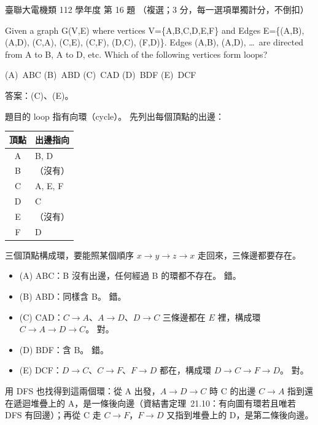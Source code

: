 \begin{pastexam}[label={px:ust-112-ee-ds-16}]{臺聯大電機類 112 學年度 第 16 題}
（複選；3 分，每一選項單獨計分，不倒扣）

Given a graph G(V,E) where vertices V=\{A,B,C,D,E,F\} and Edges E=\{(A,B), (A,D), (C,A), (C,E),
(C,F), (D,C), (F,D)\}. Edges (A,B), (A,D), \ldots\ are directed from A to B, A to D, etc. Which of
the following vertices form loops?

(A)~ABC \qquad (B)~ABD \qquad (C)~CAD \qquad (D)~BDF \qquad (E)~DCF
\end{pastexam}

\begin{pastsoln}
答案：(C)、(E)。

題目的 loop 指有向環（cycle）。 先列出每個頂點的出邊：
\begin{center}
\begin{tabular}{cl}
\toprule
頂點 & 出邊指向 \\
\midrule
A & B, D \\
B & （沒有） \\
C & A, E, F \\
D & C \\
E & （沒有） \\
F & D \\
\bottomrule
\end{tabular}
\end{center}
三個頂點構成環，要能照某個順序 $x \to y \to z \to x$ 走回來，三條邊都要存在。

\begin{itemize}
\item (A) ABC：B 沒有出邊，任何經過 B 的環都不存在。 錯。
\item (B) ABD：同樣含 B。 錯。
\item (C) CAD：$C \to A$、$A \to D$、$D \to C$ 三條邊都在 $E$ 裡，構成環 $C \to A \to D \to C$。 對。
\item (D) BDF：含 B。 錯。
\item (E) DCF：$D \to C$、$C \to F$、$F \to D$ 都在，構成環 $D \to C \to F \to D$。 對。
\end{itemize}
用 DFS 也找得到這兩個環：從 A 出發，$A \to D \to C$ 時 C 的出邊 $C \to A$ 指到還在遞迴堆疊上的
A，是一條後向邊（資結書定理~21.10：有向圖有環若且唯若 DFS 有回邊）；再從 C 走 $C \to F$，$F \to D$
又指到堆疊上的 D，是第二條後向邊。
\end{pastsoln}
